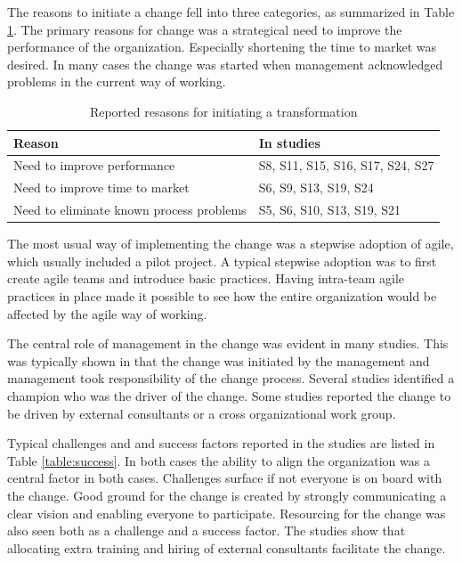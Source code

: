 \documentclass[lnbip]{svmultln}
\begin{document}
The reasons to initiate a change fell into three categories, as summarized in
Table \ref{table:motivations}. The primary reasons for change was a strategical
need to improve the performance of the organization. Especially shortening the
time to market was desired. In many cases the change was started when management
acknowledged problems in the current way of working.

\begin{table}[t]
    \begin{tabular}{ l@{ \hskip 0.4cm } l }
        \toprule
        Reason                                    & In studies   \\ \midrule
        Need to improve performance               & S8, S11, S15, S16, S17, S24, S27 \\ 
        Need to improve time to market            & S6, S9, S13, S19, S24 \\
        Need to eliminate known process problems  & S5, S6, S10, S13, S19, S21 \\
        \bottomrule
    \end{tabular}
    \caption{Reported resasons for initiating a transformation}
    \label{table:motivations}
\end{table}


The most usual way of implementing the change was a stepwise adoption of agile,
which usually included a pilot project. A typical stepwise adoption was to first
create agile teams and introduce basic practices. Having intra-team agile
practices in place made it possible to see how the entire organization would be
affected by the agile way of working.

The central role of management in the change was evident in many studies. This
was typically shown in that the change was initiated by the management and
management took responsibility of the change process. Several studies identified
a champion who was the driver of the change. Some studies reported the change to
be driven by external consultants or a cross organizational work group.

Typical challenges and and success factors reported in the studies are listed in
Table \ref{table:success}. In both cases the ability to align the organization
was a central factor in both cases. Challenges surface if not everyone is on
board with the change. Good ground for the change is created by strongly
communicating a clear vision and enabling everyone to participate. Resourcing
for the change was also seen both as a challenge and a success factor.
The studies show that allocating extra training and hiring of external consultants
facilitate the change.
\end{document}
